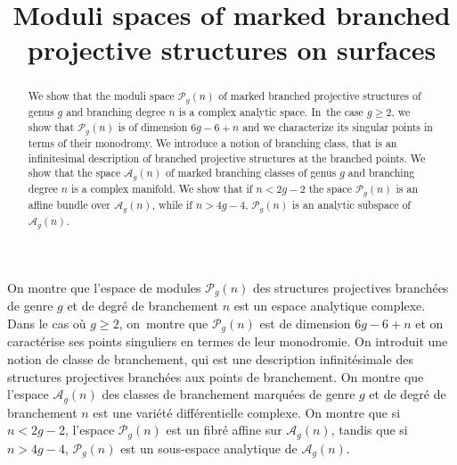 \documentclass[JEP,XML,SOM,Unicode,NoEqCountersInSection,published]{cedram}
\theoremstyle{definition}
\theoremstyle{plain}
\begin{document}
\frontmatter
\title{Moduli spaces of marked branched projective structures on surfaces}

\author[\initial{G.} \lastname{Billon}]{ }
\address{IRMA, CNRS, Université de Strasbourg,\\
7 rue René Descartes, 67084 Strasbourg Cedex, France}

\begin{abstract}
We show that the moduli space $\mathcal P_g(n)$ of marked branched projective structures of genus $g$ and branching degree $n$ is a complex analytic space. In~the case $g \ge 2$, we show that $\mathcal P_g(n)$ is of dimension $6g-6+n$ and we characterize its singular points in terms of their monodromy. We introduce a notion of branching class, that is an infinitesimal description of branched projective structures at the branched points. We show that the space $\mathcal A_g(n)$ of marked branching classes of genus $g$ and branching degree $n$ is a complex manifold. We show that if $n < 2g-2$ the space $\mathcal P_g(n)$ is an affine bundle over $\mathcal A_g(n)$, while if $n > 4g-4$, $\mathcal P_g(n)$ is an analytic subspace of $\mathcal A_g(n)$.
\end{abstract}





\begin{altabstract}
On montre que l’espace de modules $\mathcal P_g(n)$ des structures projectives branchées de genre $g$ et de degré de branchement $n$ est un espace analytique complexe. Dans le cas où $g \ge 2$, on~montre que $\mathcal P_g(n)$ est de dimension $6g-6+n$ et on caractérise ses points singuliers en termes de leur monodromie. On introduit une notion de classe de branchement, qui est une description infinitésimale des structures projectives branchées aux points de branchement. On montre que l’espace $\mathcal A_g(n)$ des classes de branchement marquées de genre $g$ et de degré de branchement $n$ est une variété différentielle complexe. On montre que si $n < 2g-2$, l’espace $\mathcal P_g(n)$ est un fibré affine sur $\mathcal A_g(n)$, tandis que si $n>4g-4$, $\mathcal P_g(n)$ est un sous-espace analytique de $\mathcal A_g(n)$.
\end{altabstract}
\end{document}
